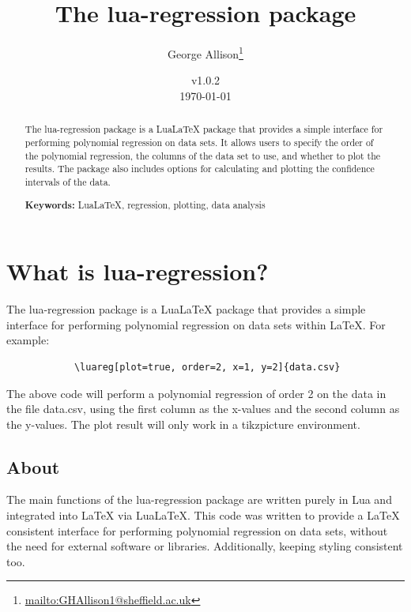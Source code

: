\documentclass[11pt]{article}
\title{The {\ttfamily lua-regression} package}
\author{George Allison\thanks{\href{mailto:GHAllison1@sheffield.ac.uk}{\ttfamily mailto:GHAllison1@sheffield.ac.uk}}}
\date{v1.0.2\\ \today}
\begin{document}
    \maketitle
    
    \begin{abstract}
        The {\ttfamily lua-regression} package is a Lua\LaTeX{} package that provides a simple interface for performing polynomial regression on data sets.
        It allows users to specify the order of the polynomial regression, the columns of the data set to use, and whether to plot the results.
        The package also includes options for calculating and plotting the confidence intervals of the data.

        \vspace{1em}
        
        \textbf{Keywords:} LuaLaTeX, regression, plotting, data analysis
    \end{abstract}

    \tableofcontents

    \pagebreak

    \section{What is {\ttfamily lua-regression}?}

    The {\ttfamily lua-regression} package is a Lua\LaTeX{} package that provides a simple interface for performing polynomial regression on data sets within \LaTeX{}. For example:

	\begin{codebox}
		\begin{verbatim}
			\luareg[plot=true, order=2, x=1, y=2]{data.csv}
		\end{verbatim}
	\end{codebox}

    
    The above code will perform a polynomial regression of order 2 on the data in the file {\ttfamily data.csv}, using the first column as the x-values and the second column as the y-values.
    The plot result will only work in a tikzpicture environment.


    \subsection{About}

    The main functions of the {\ttfamily lua-regression} package are written purely in Lua and integrated into \LaTeX{} via Lua\LaTeX{}.
    This code was written to provide a \LaTeX{} consistent interface for performing polynomial regression on data sets, without the need for external software or libraries.
    Additionally, keeping styling consistent too.
    
\end{document}
